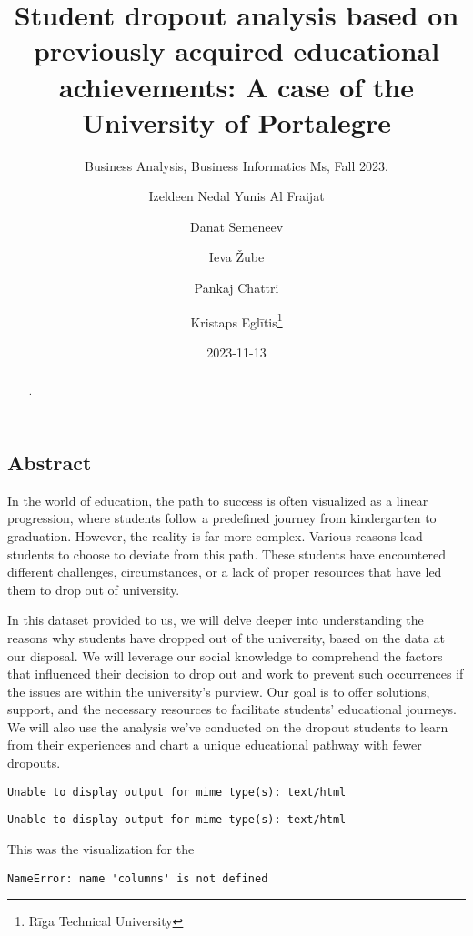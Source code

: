 \documentclass[
  letterpaper,
  DIV=11,
  numbers=noendperiod]{scrartcl}
\title{Student dropout analysis based on previously acquired educational
achievements: A case of the University of Portalegre}
\subtitle{Business Analysis, Business Informatics Ms, Fall 2023.}
\author{Izeldeen Nedal Yunis Al Fraijat \and Danat Semeneev \and Ieva
Žube \and Pankaj Chattri \and Kristaps Eglītis\footnote{Rīga Technical
  University}}
\date{2023-11-13}
\begin{document}
\maketitle
\begin{abstract}
.
\end{abstract}
\ifdefined\Shaded\renewenvironment{Shaded}{\begin{tcolorbox}[breakable, borderline west={3pt}{0pt}{shadecolor}, frame hidden, boxrule=0pt, sharp corners, interior hidden, enhanced]}{\end{tcolorbox}}\fi

\hypertarget{abstract}{%
\subsection{Abstract}\label{abstract}}

In the world of education, the path to success is often visualized as a
linear progression, where students follow a predefined journey from
kindergarten to graduation. However, the reality is far more complex.
Various reasons lead students to choose to deviate from this path. These
students have encountered different challenges, circumstances, or a lack
of proper resources that have led them to drop out of university.

In this dataset provided to us, we will delve deeper into understanding
the reasons why students have dropped out of the university, based on
the data at our disposal. We will leverage our social knowledge to
comprehend the factors that influenced their decision to drop out and
work to prevent such occurrences if the issues are within the
university's purview. Our goal is to offer solutions, support, and the
necessary resources to facilitate students' educational journeys. We
will also use the analysis we've conducted on the dropout students to
learn from their experiences and chart a unique educational pathway with
fewer dropouts.

\begin{verbatim}
Unable to display output for mime type(s): text/html
\end{verbatim}

\begin{verbatim}
Unable to display output for mime type(s): text/html
\end{verbatim}

This was the visualization for the

\begin{verbatim}
NameError: name 'columns' is not defined
\end{verbatim}
\end{document}
